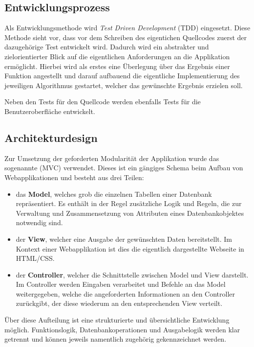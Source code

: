 \subsection{Entwicklungsprozess}
\label{sec:Entwicklungsprozess}
Als Entwicklungsmethode wird \textit{Test Driven Development} (\acs{TDD}) eingesetzt. Diese Methode
sieht vor, dass vor dem Schreiben des eigentichen Quellcodes zuerst der
dazugehörige Test entwickelt wird. Dadurch wird ein abstrakter und
zielorientierter Blick auf die eigentlichen Anforderungen an die Applikation ermöglicht.
Hierbei wird als erstes eine Überlegung über das Ergebnis einer Funktion angestellt und darauf
aufbauend die eigentliche Implementierung des jeweiligen Algorithmus gestartet, welcher das gewünschte
Ergebnis erzielen soll.

Neben den Tests für den Quellcode werden ebenfalls Tests für die Benutzeroberfläche entwickelt.

\subsection{Architekturdesign}
\label{sec:Architekturdesign}
Zur Umsetzung der geforderten Modularität der Applikation wurde das sogenannte
 (\acs{MVC}) verwendet. Dieses ist ein gängiges Schema beim Aufbau von
Webapplikationen und besteht aus drei Teilen:
\begin{itemize}
	\item das \textbf{Model}, welches grob die einzelnen Tabellen einer Datenbank repräsentiert. Es enthält in
	der Regel zusätzliche Logik und Regeln, die zur Verwaltung und Zusammensetzung von Attributen
	eines Datenbankobjektes notwendig sind.
	\item der \textbf{View}, welcher eine Ausgabe der gewünschten Daten bereitstellt. Im Kontext einer
	Webapplikation ist dies die eigentlich dargestellte Webseite in \acs{HTML}/\acs{CSS}.
	\item der \textbf{Controller}, welcher die Schnittstelle zwischen Model und View darstellt.
	Im Controller werden Eingaben verarbeitet und Befehle an das Model weitergegeben, welche
	die angeforderten Informationen an den Controller zurückgibt, der diese wiederum an den
	entsprechenden View verteilt.
\end{itemize}
Über diese Aufteilung ist eine strukturierte und übersichtliche Entwicklung möglich. Funktionslogik,
Datenbankoperationen und Ausgabelogik werden klar getrennt und können jeweils namentlich zugehörig
gekennzeichnet werden.

